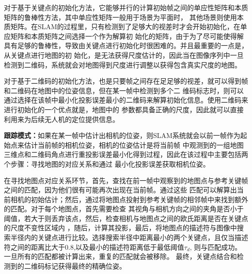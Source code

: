 对于基于关键点的初始化方法，它能够并行的计算初始帧之间的单应性矩阵和本质矩阵的鲁棒性方法，其中单应性矩阵一般用于场景为平面时，
其他场景则使用本质矩阵。在SLAM的过程里，只有检测到了足够大的视差时才会开始初始化，在单应矩阵和本质矩阵之间选择一个作为解算初
始化的矩阵，由于为了尽可能使得解具有足够的鲁棒性，导致由关键点进行初始化时很困难的。并且最重要的一点是，从关键点进行地图的初
始化，是无法获得尺度估计的，因此当在图像序列中一旦检测到二维码，系统就会对地图得到尺度进行调整以获得包含真实尺度的地图。

对于基于二维码的初始化方法，也是只要帧之间存在足足够的视差，就可以得到帧和二维码在地图中的位姿信息，但在某一帧中检测到多个二
维码标志时，则可以通过选择在该帧中最小化投影误差最小的二维码来解算初始化信息。使用二维码来进行初始化的一个优点就是，地图中的
参数都具备正确的尺度，因此就可以直接利用来为后续无人机的定位提供信息。

\textbf{跟踪模式：}如果在某一帧中估计出相机的位姿，则SLAM系统就会以前一帧作为起始点来估计当前帧的相机位姿，相机的位姿估计是将当前帧
中观测到的一组地图三维点和二维码角点进行重投影误差最小化得到过程，因此在该过程中主要包括两个步骤：寻找地图的对应关系和通过
最小化投影误差获取相机位姿。

在寻找地图点对应关系环节，首先，查找在前一帧中观察到的地图点与参考关键帧之间的匹配，因为他们很有可能再次出现在当前帧。通过这些
匹配可以解算出当前相机的初始估计；然后，通过将地图点投射到参考关键帧的相邻帧中来找到额外的匹配。对于每个地图点，首先需要检查
其视角与相机方向之间的夹角是否小于阈值，若大于则丢弃该点，然后，检查相机与地图点之间的欧氏距离是否在关键点的尺度不变性区域内
，随后，计算其投影，最后，将地图点的描述符与图像中搜索半径内的关键点进行比较。选择搜索半径中距离最小的两个关键点，且仅当描述
符之间的距离比大于0.8,以及最小的描述符距离低于最低阈值$\tau_d$, 则与匹配成功。一旦所有的匹配都被计算出来，重复的匹配就会被移除。
最终，关键点结合和检测到的二维码标记获得最终的精确位姿。

